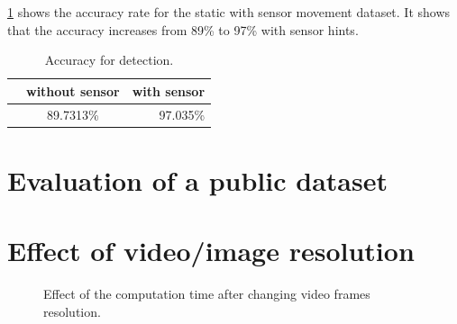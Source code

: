 \ref{t:acc_stat} shows the accuracy rate for the static with sensor movement dataset.
It shows that the accuracy increases from 89\% to 97\% with sensor hints.

\begin{table}[h!]
  \centering
  \caption{Accuracy for detection.}
  \label{t:acc_stat}
  \begin{tabular}{  l  c | r  }
   
     & without sensor & with sensor  \\
    \hline
    & 89.7313\% & 97.035\%  \\
    \hline
  \end{tabular}
\end{table}


\section{Evaluation of a public dataset}


\section{Effect of video/image resolution}


\begin{figure}[h!]
  \centering
  \vspace{2in}
  \caption{Effect of the computation time after changing video frames resolution.}
  \label{f:vf_res}
\end{figure}

